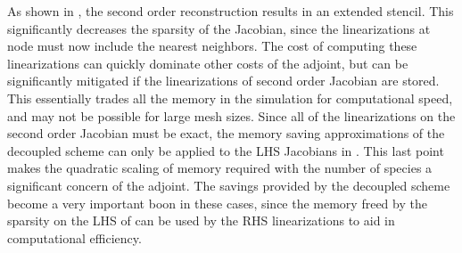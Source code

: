 As shown in , the second order
reconstruction results in an extended stencil.  This significantly decreases the
sparsity of the Jacobian, since the linearizations at node must now include the
nearest neighbors.  The cost of computing these linearizations can quickly
dominate other costs of the adjoint, but can be significantly mitigated if the
linearizations of second order Jacobian are stored.  This essentially trades all
the memory in the simulation for computational speed, and may not be possible
for large mesh sizes.  Since all of the linearizations on the second order
Jacobian must be exact, the memory saving approximations of the decoupled scheme
can only be applied to the LHS Jacobians in .  This last
point makes the quadratic scaling of memory required with the number of species
a significant concern of the adjoint.  The savings provided by the decoupled
scheme become a very important boon in these cases, since the memory freed by
the sparsity on the LHS of  can be used by the RHS
linearizations to aid in computational efficiency.
